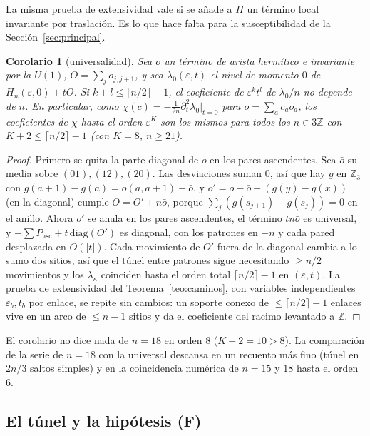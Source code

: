 \documentclass[11pt,a4paper]{article}
\newtheorem{corolario}[teorema]{Corolario}
\theoremstyle{definition}
\theoremstyle{remark}
\newcommand{\Pasc}{P_{\mathrm{asc}}}
\newcommand{\eps}{\varepsilon}
\begin{document}
La misma prueba de extensividad vale si se añade a $H$ un término local invariante por traslación. Es lo
que hace falta para la susceptibilidad de la Sección~\ref{sec:principal}.

\begin{corolario}[universalidad]\label{cor:universal}
Sea $o$ un término de arista hermítico e invariante por la $U(1)$, $O=\sum_jo_{j,j+1}$, y sea
$\lambda_0(\eps,t)$ el nivel de momento $0$ de $H_n(\eps,0)+tO$. Si $k+l\le\lceil n/2\rceil-1$, el coeficiente
de $\eps^kt^l$ de $\lambda_0/n$ no depende de $n$. En particular, como
$\chi(c)=-\frac1{2n}\partial_t^2\lambda_0|_{t=0}$ para $o=\sum_ac_ao_a$, los coeficientes de $\chi$ hasta el orden
$\eps^K$ son los mismos para todos los $n\in3\mathbb Z$ con $K+2\le\lceil n/2\rceil-1$ (con $K=8$, $n\ge21$).
\end{corolario}

\begin{proof}
Primero se quita la parte diagonal de $o$ en los pares ascendentes. Sea $\bar o$ su media sobre
$(01),(12),(20)$. Las desviaciones suman $0$, así que hay $g$ en $\mathbb Z_3$ con
$g(a+1)-g(a)=o(a,a+1)-\bar o$, y $o'=o-\bar o-(g(y)-g(x))$ (en la diagonal) cumple $O=O'+n\bar o$, porque
$\sum_j(g(s_{j+1})-g(s_j))=0$ en el anillo. Ahora $o'$ se anula en los pares ascendentes, el término $tn\bar o$
es universal, y $-\sum\Pasc+t\,\mathrm{diag}(O')$ es diagonal, con los patrones en $-n$ y cada pared desplazada
en $O(|t|)$. Cada movimiento de $O'$ fuera de la diagonal cambia a lo sumo dos sitios, así que el túnel entre
patrones sigue necesitando $\ge n/2$ movimientos y los $\lambda_\kappa$ coinciden hasta el orden total
$\lceil n/2\rceil-1$ en $(\eps,t)$. La prueba de extensividad del Teorema~\ref{teo:caminos}, con variables
independientes $\eps_b,t_b$ por enlace, se repite sin cambios: un soporte conexo de $\le\lceil n/2\rceil-1$
enlaces vive en un arco de $\le n-1$ sitios y da el coeficiente del racimo levantado a $\mathbb Z$.
\end{proof}

\noindent
El corolario no dice nada de $n=18$ en orden $8$ ($K+2=10>8$). La comparación de la serie de $n=18$ con la
universal descansa en un recuento más fino (túnel en $2n/3$ saltos simples) y en la coincidencia numérica de
$n=15$ y $18$ hasta el orden $6$.

\subsection{El túnel y la hipótesis (F)}
\end{document}
